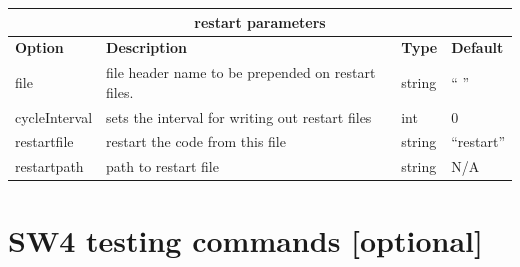 \documentclass[11pt]{report}
\begin{document}
\begin{center}
\begin{tabular}{|l|p{8cm}|l|l|} \hline
\multicolumn{4}{|c|}{\bf restart parameters}\\ \hline
\bf{Option} & \bf{Description} & \bf{Type} & \bf{Default} \\ \hline \hline
file & file header name to be prepended on restart files. & string & `` ''  \\ 
\hline
cycleInterval & sets the interval for writing out restart files & int & 0 \\ 
\hline
restartfile & restart the code from this file & string & ``restart''  \\ \hline
restartpath & path to restart file & string & N/A \\ \hline
\end{tabular}
\end{center}



\section{SW4 testing commands [optional]}

\end{document}
